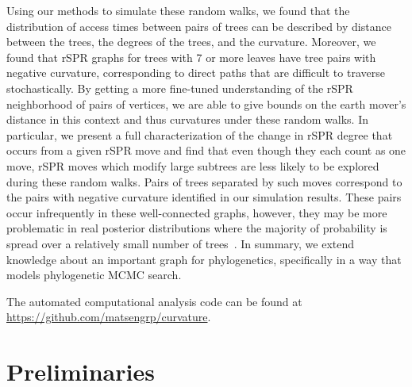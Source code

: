 \documentclass[]{elsarticle}
\begin{document}
Using our methods to simulate these random walks, we found that the distribution of access times between pairs of trees can be described by distance between the trees, the degrees of the trees, and the curvature.
Moreover, we found that rSPR graphs for trees with 7 or more leaves have tree pairs with negative curvature, corresponding to direct paths that are difficult to traverse stochastically.
By getting a more fine-tuned understanding of the rSPR neighborhood of pairs of vertices, we are able to give bounds on the earth mover's distance in this context and thus curvatures under these random walks.
In particular, we present a full characterization of the change in rSPR degree that occurs from a given rSPR move and find that even though they each count as one move, rSPR moves which modify large subtrees are less likely to be explored during these random walks.
Pairs of trees separated by such moves correspond to the pairs with negative curvature identified in our simulation results.
These pairs occur infrequently in these well-connected graphs, however, they may be more problematic in real posterior distributions where the majority of probability is spread over a relatively small number of trees~\citep{Whidden2015-yi}.
In summary, we extend knowledge about an important graph for phylogenetics, specifically in a way that models phylogenetic MCMC search.

The automated computational analysis code can be found at \url{https://github.com/matsengrp/curvature}.

\section{Preliminaries}
\end{document}
